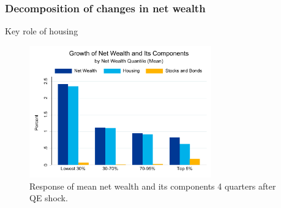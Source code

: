 \documentclass[pdflatex,aspectratio=169]{beamer}
\begin{document}
\begin{frame}\frametitle{\bf Decomposition of changes in net wealth  \hypertarget{WealthDecomp}{}}
Key role of housing \hyperlink{WealthIneq}{}
\begin{figure}
\begin{center}
\includegraphics[width=0.7\textwidth]{./figures/wealthDecomp}\\
{\scriptsize Response of mean net wealth and its components 4 quarters after QE shock. }
\end{center}
\end{figure}

\end{frame}
\end{document}
